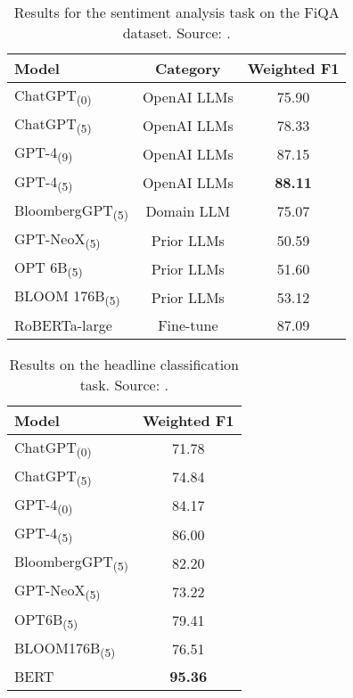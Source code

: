 \begin{table}[!h]
	\centering
	\begin{tabularx}{0.8\textwidth}{Xcc}
		\toprule
		\textbf{Model}                  & \textbf{Category} & \textbf{Weighted F1} \\
		\midrule
		ChatGPT\textsubscript{(0)}      & OpenAI LLMs       & 75.90                \\
		ChatGPT\textsubscript{(5)}      & OpenAI LLMs       & 78.33                \\
		GPT-4\textsubscript{(9)}        & OpenAI LLMs       & 87.15                \\
		GPT-4\textsubscript{(5)}        & OpenAI LLMs       & \textbf{88.11}       \\
		\addlinespace
		BloombergGPT\textsubscript{(5)} & Domain LLM        & 75.07                \\
		\addlinespace
		GPT-NeoX\textsubscript{(5)}     & Prior LLMs        & 50.59                \\
		OPT 6B\textsubscript{(5)}       & Prior LLMs        & 51.60                \\
		BLOOM 176B\textsubscript{(5)}   & Prior LLMs        & 53.12                \\
		\addlinespace
		RoBERTa-large                   & Fine-tune         & 87.09                \\
		\bottomrule
	\end{tabularx}
	\caption{Results for the sentiment analysis task on the FiQA dataset. Source: \protect\textcite{li2023chatgpt}.}
	\label{tab:fiqa_results}
\end{table}

\begin{table}[!h]
	\centering
	\begin{tabularx}{0.8\textwidth}{Xc}
		\toprule
		\textbf{Model}                  & \textbf{Weighted F1} \\
		\midrule
		ChatGPT\textsubscript{(0)}      & 71.78                \\
		ChatGPT\textsubscript{(5)}      & 74.84                \\
		GPT-4\textsubscript{(0)}        & 84.17                \\
		GPT-4\textsubscript{(5)}        & 86.00                \\
		BloombergGPT\textsubscript{(5)} & 82.20                \\
		GPT-NeoX\textsubscript{(5)}     & 73.22                \\
		OPT6B\textsubscript{(5)}        & 79.41                \\
		BLOOM176B\textsubscript{(5)}    & 76.51                \\
		BERT                            & \textbf{95.36}       \\
		\bottomrule
	\end{tabularx}
	\caption{Results on the headline classification task. Source: \protect\textcite{li2023chatgpt}.}
	\label{tab:headline_classification}
\end{table}

